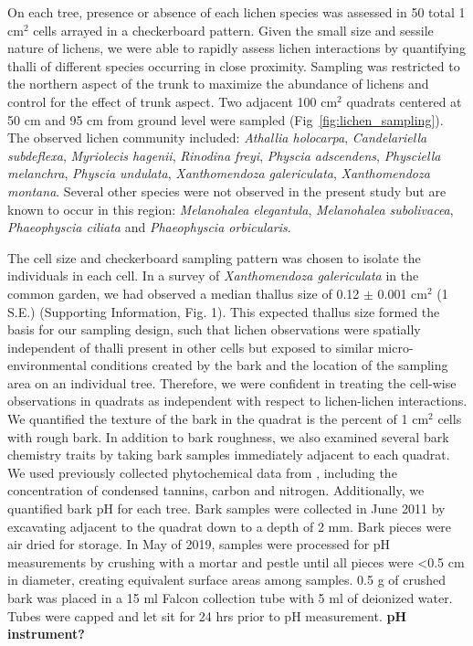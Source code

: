 \documentclass[fleqn,12pt]{olplainarticle}
\begin{document}
On each tree, presence or absence of each lichen species was assessed
in 50 total 1 cm$^2$ cells arrayed in a checkerboard pattern. Given
the small size and sessile nature of lichens, we were able to rapidly
assess lichen interactions by quantifying thalli of different species
occurring in close proximity. Sampling was restricted to the northern
aspect of the trunk to maximize the abundance of lichens and control
for the effect of trunk aspect. Two adjacent 100 cm$^2$ quadrats
centered at 50 cm and 95 cm from ground level were sampled
(Fig~\ref{fig:lichen_sampling}). The observed lichen community
included: \textit{Athallia holocarpa}, \textit{Candelariella
  subdeflexa}, \textit{Myriolecis hagenii}, \textit{Rinodina freyi},
\textit{Physcia adscendens}, \textit{Physciella melanchra},
\textit{Physcia undulata}, \textit{Xanthomendoza galericulata},
\textit{Xanthomendoza montana}. Several other species were not
observed in the present study but are known to occur in this region:
\textit{Melanohalea elegantula}, \textit{Melanohalea subolivacea},
\textit{Phaeophyscia ciliata} and \textit{Phaeophyscia orbicularis}.

The cell size and checkerboard sampling pattern was chosen to isolate
the individuals in each cell. In a survey of \textit{Xanthomendoza
  galericulata} in the common garden, we had observed a median thallus
size of 0.12 $\pm$ 0.001 cm$^2$ (1 S.E.)  (Supporting Information,
Fig. 1). This expected thallus size formed the basis for our sampling
design, such that lichen observations were spatially independent of
thalli present in other cells but exposed to similar
micro-environmental conditions created by the bark and the location of
the sampling area on an individual tree. Therefore, we were confident
in treating the cell-wise observations in quadrats as independent with
respect to lichen-lichen interactions. We quantified the texture of
the bark in the quadrat is the percent of 1 cm$^2$ cells with rough
bark. In addition to bark roughness, we also examined several bark
chemistry traits by taking bark samples immediately adjacent to each
quadrat.  We used previously collected phytochemical data from
\cite{Lamit2011}, including the concentration of condensed tannins,
carbon and nitrogen. Additionally, we quantified bark pH for each
tree.  Bark samples were collected in June 2011 by excavating adjacent
to the quadrat down to a depth of 2 mm. Bark pieces were air dried for
storage.  In May of 2019, samples were processed for pH measurements
by crushing with a mortar and pestle until all pieces were <0.5 cm in
diameter, creating equivalent surface areas among samples. 0.5 g of
crushed bark was placed in a 15 ml Falcon collection tube with 5 ml of
deionized water. Tubes were capped and let sit for 24 hrs prior to pH
measurement. \textbf{pH instrument?}
\end{document}

